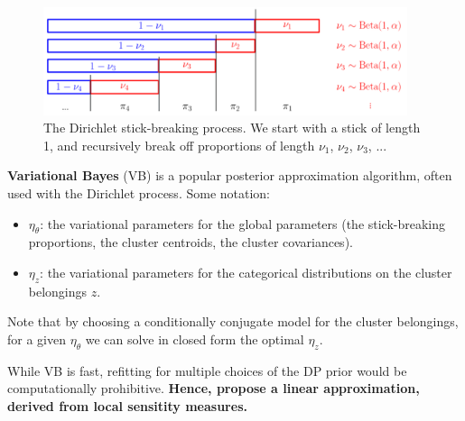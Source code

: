 \documentclass[a0,plainsections,30pt]{sciposter}\usepackage[]{graphicx}\usepackage[]{color}
\newcommand{\etazopt}{\eta_z^{*}}
\newcommand{\etathetaopt}{\eta_\theta^{*}}
\DeclareMathOperator*{\argmin}{arg\,min}
\begin{document}
\begin{minipage}[t]{0.45\textwidth}
\begin{figure}[!h]
\centering
\includegraphics[width = 0.95\textwidth]{./images/DP_stick_breaking.png}
\caption{The Dirichlet stick-breaking process. We start with a stick of
length 1, and recursively break off proportions of length $\nu_1$, $\nu_2$, $\nu_3$, ...}
\setlength{\textfloatsep}{-10pt}
\end{figure}

% 
% 

\vspace{-0.3in}

\textbf{Variational Bayes} (VB) is a popular posterior approximation
algorithm, often used with the Dirichlet process. Some notation: 

\begin{itemize}
\item $\eta_\theta$: the variational parameters for the global parameters (the stick-breaking proportions, the cluster centroids, the cluster covariances). 
\item $\eta_z$: the variational parameters for the categorical distributions on the 
cluster belongings $z$. 
\end{itemize}

Note that by choosing a conditionally conjugate model for the cluster belongings, for a given $\eta_\theta$ we can solve in closed form the optimal $\eta_z$.

\begin{mdframed}[style=MyFrame]
While VB is fast, refitting for multiple choices of the DP prior would be
computationally prohibitive. {\bf Hence, propose a linear approximation, derived from local sensitity measures. }
\end{mdframed}



\end{minipage}
\end{document}
